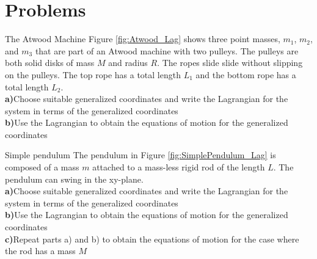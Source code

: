 %
\section{Problems}

\begin{problem}{The Atwood Machine}
Figure \ref{fig:Atwood_Lag} shows three point masses, $m_1$, $m_2$, and $m_3$ that are part of an Atwood machine with two pulleys. The pulleys are both solid disks of mass $M$ and radius $R$. The ropes slide slide without slipping on the pulleys. The top rope has a total length $L_1$ and the bottom rope has a total length $L_2$.
\\
\textbf{a)}Choose suitable generalized coordinates and write the Lagrangian for the system in terms of the generalized coordinates\\
\textbf{b)}Use the Lagrangian to obtain the equations of motion for the generalized coordinates\\
\label{prob_Lagrange_1}
\end{problem}

\begin{problem}{Simple pendulum}
The pendulum in Figure \ref{fig:SimplePendulum_Lag} is composed of a mass $m$ attached to a mass-less rigid rod of the length $L$. The pendulum can swing in the xy-plane. 
\\
\textbf{a)}Choose suitable generalized coordinates and write the Lagrangian for the system in terms of the generalized coordinates\\
\textbf{b)}Use the Lagrangian to obtain the equations of motion for the generalized coordinates\\
\textbf{c)}Repeat parts a) and b) to obtain the equations of motion for the case where the rod has a mass $M$\\
\label{prob_Lagrange_2}
\end{problem}

